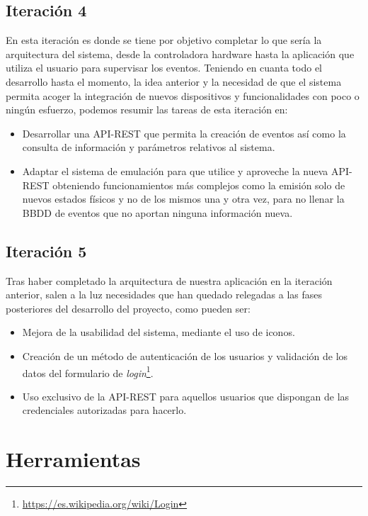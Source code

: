 \subsection{Iteración 4}
\label{sub:metodologiaiter4}
En esta iteración es donde se tiene por objetivo completar lo que sería la arquitectura del sistema, desde la controladora hardware hasta la aplicación que utiliza el usuario para supervisar los eventos. Teniendo en cuanta todo el desarrollo hasta el momento, la idea anterior y la necesidad de que el sistema permita acoger la integración de nuevos dispositivos y funcionalidades con poco o ningún esfuerzo, podemos resumir las tareas de esta iteración en:

\begin{itemize}
\item Desarrollar una \acs{API}-\acs{REST} que permita la creación de eventos así como la consulta de información y parámetros relativos al sistema.
\item Adaptar el sistema de emulación para que utilice y aproveche la nueva \acs{API}-\acs{REST} obteniendo funcionamientos más complejos como la emisión solo de nuevos estados físicos y no de los mismos una y otra vez, para no llenar la \acs{BBDD} de eventos que no aportan ninguna información nueva.

\end{itemize}

\subsection{Iteración 5}
Tras haber completado la arquitectura de nuestra aplicación en la iteración anterior, salen a la luz necesidades que han quedado relegadas a las fases posteriores del desarrollo del proyecto, como pueden ser:

\begin{itemize}
\item Mejora de la usabilidad del sistema, mediante el uso de iconos.
\item Creación de un método de autenticación de los usuarios y validación de los datos del formulario de \textit{login}\footnote{\url{https://es.wikipedia.org/wiki/Login}}.
\item Uso exclusivo de la \acs{API}-\acs{REST} para aquellos usuarios que dispongan de las credenciales autorizadas para hacerlo.
\end{itemize} 

\section{Herramientas}

